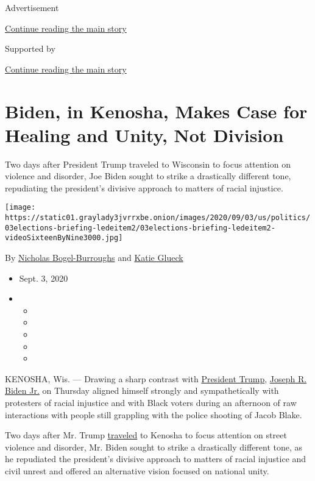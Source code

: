 Advertisement

\protect\hyperlink{after-top}{Continue reading the main story}

Supported by

\protect\hyperlink{after-sponsor}{Continue reading the main story}

\hypertarget{biden-in-kenosha-makes-case-for-healing-and-unity-not-division}{%
\section{Biden, in Kenosha, Makes Case for Healing and Unity, Not
Division}\label{biden-in-kenosha-makes-case-for-healing-and-unity-not-division}}

Two days after President Trump traveled to Wisconsin to focus attention
on violence and disorder, Joe Biden sought to strike a drastically
different tone, repudiating the president's divisive approach to matters
of racial injustice.

\texttt{[image: https://static01.graylady3jvrrxbe.onion/images/2020/09/03/us/politics/03elections-briefing-ledeitem2/03elections-briefing-ledeitem2-videoSixteenByNine3000.jpg]}

By
\href{https://www.nytimes3xbfgragh.onion/by/nicholas-bogel-burroughs}{Nicholas
Bogel-Burroughs} and
\href{https://www.nytimes3xbfgragh.onion/by/katie-glueck}{Katie Glueck}

\begin{itemize}
\item
  Sept. 3, 2020
\item
  \begin{itemize}
  \item
  \item
  \item
  \item
  \item
  \end{itemize}
\end{itemize}

KENOSHA, Wis. --- Drawing a sharp contrast with
\href{https://www.nytimes3xbfgragh.onion/interactive/2020/us/elections/donald-trump.html}{President
Trump},
\href{https://www.nytimes3xbfgragh.onion/interactive/2020/us/elections/joe-biden.html}{Joseph
R. Biden Jr.} on Thursday aligned himself strongly and sympathetically
with protesters of racial injustice and with Black voters during an
afternoon of raw interactions with people still grappling with the
police shooting of Jacob Blake.

Two days after Mr. Trump
\href{https://www.nytimes3xbfgragh.onion/live/2020/09/01/us/trump-vs-biden/trump-is-greeted-by-protesters-and-supporters-as-he-visits-wisconsin}{traveled}
to Kenosha to focus attention on street violence and disorder, Mr. Biden
sought to strike a drastically different tone, as he repudiated the
president's divisive approach to matters of racial injustice and civil
unrest and offered an alternative vision focused on national unity.

